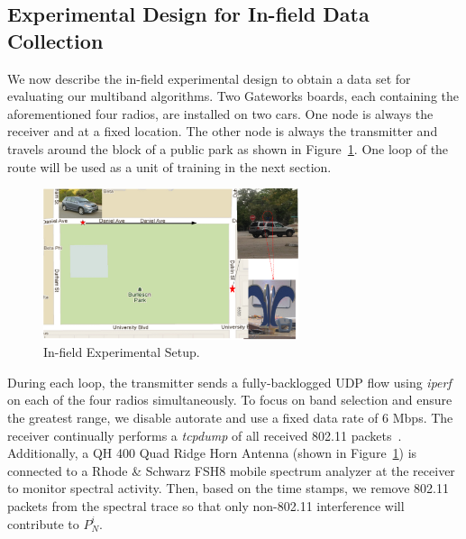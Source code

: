 \subsection{Experimental Design for In-field Data Collection}
\label{subsec:insitu}
We now describe the in-field experimental design to obtain a data set for
evaluating our multiband algorithms. Two Gateworks boards, each containing
the aforementioned four radios, are installed on two cars.  One node is always
the receiver and at a fixed location. The other node is always the 
transmitter and travels 
around the block of a public park as shown in Figure~\ref{fig:infield}.
One loop of the route will be used as a unit of training in the next section.

\begin{figure} [h]
\centering
\includegraphics[width=75mm]{figures/infield}
\vspace{-0.1in}
\caption{In-field Experimental Setup.}
\label{fig:infield}
\vspace{-0.1in}
\end{figure}

During each loop, the transmitter sends a fully-backlogged UDP flow
using {\it iperf} on each of the four radios simultaneously.  To
focus on band selection and ensure the greatest range, we disable autorate and use a fixed data rate
of 6 Mbps. The receiver continually performs a {\it tcpdump} of all
received 802.11 packets~\cite{jacobson1989tcpdump}. Additionally, a
QH 400 Quad Ridge Horn Antenna (shown in Figure~\ref{fig:infield}) is 
connected to a Rhode \& Schwarz FSH8 mobile spectrum analyzer at the 
receiver to monitor spectral activity. Then, based on the 
time stamps, we remove 802.11 packets from the spectral trace 
so that only non-802.11 interference will contribute to $P_N^i$.

